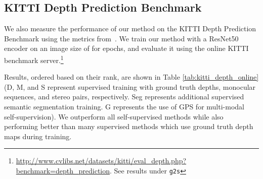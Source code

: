 \subsection{KITTI Depth Prediction Benchmark}
We also measure the performance of our method on the KITTI Depth Prediction Benchmark using the 
metrics from~\cite{Uhrig2017THREEDV}. We train our method with a ResNet50 encoder on an image size of  for  epochs, and evaluate it using the online KITTI benchmark server.\footnote{\url{http://www.cvlibs.net/datasets/kitti/eval_depth.php?benchmark=depth_prediction}. See results under \texttt{g2s}} 

Results, ordered based on their rank, are shown in Table \ref{tab:kitti_depth_online} (D, M, and S represent supervised training with ground truth depths, monocular sequences, and stereo pairs, respectively. Seg represents additional supervised semantic segmentation training. G represents the use of GPS for multi-modal self-supervision).  We outperform all self-supervised methods while also performing better than many supervised methods which use ground truth depth maps during training.

